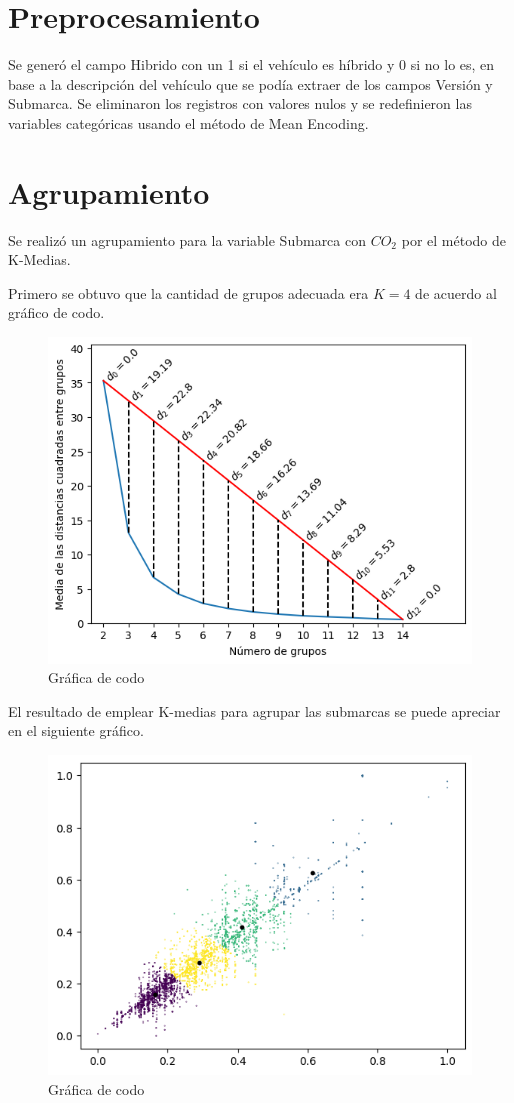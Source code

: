 \documentclass{article}
\begin{document}
\section{Preprocesamiento}

Se generó el campo Hibrido con un 1 si el vehículo es híbrido y 0 si no lo es, en base a la descripción del vehículo que se podía extraer de los campos Versión y Submarca. Se eliminaron los registros con valores nulos y se redefinieron las variables categóricas usando el método de Mean Encoding.


\section{Agrupamiento}

Se realizó un agrupamiento para la variable Submarca con $CO_2$ por el método de K-Medias.

Primero se obtuvo que la cantidad de grupos adecuada era $K=4$ de acuerdo al gráfico de codo.

\begin{figure}[h]
  \centering
  \includegraphics[width=.5\linewidth]{imagenes/2_codo.png}
  \caption{Gráfica de codo}
  \label{fig:nombre}
\end{figure}

El resultado de emplear K-medias para agrupar las submarcas se puede apreciar en el siguiente gráfico.

\begin{figure}[h]
  \centering
  \includegraphics[width=.5\linewidth]{imagenes/3_k-medias.png}
  \caption{Gráfica de codo}
  \label{fig:nombre}
\end{figure}
\end{document}
